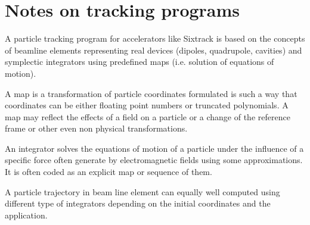 \documentclass[english]{article}
\begin{document}



\section{Notes on tracking programs}

A particle tracking program for accelerators like Sixtrack is based on the
concepts of beamline elements representing real devices (dipoles, quadrupole,
cavities) and symplectic integrators using predefined maps (i.e.  solution of
equations of motion).

A map is a transformation of particle coordinates formulated is such a way
that coordinates can be either floating point numbers or truncated
polynomials. A map may reflect the effects of a field on a particle or a
change of the reference frame or other even non physical transformations.

An integrator solves the equations of motion of a particle under the influence
of a specific force often generate by electromagnetic fields using some
approximations. It is often coded as an explicit map or sequence of them.

A particle trajectory in beam line element can equally well computed using
different type of integrators depending on the initial coordinates and the
application.
\end{document}
